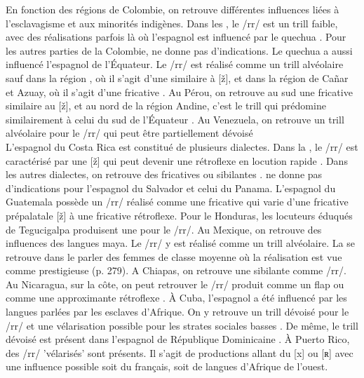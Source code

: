 En fonction des régions de Colombie, on retrouve différentes influences liées à l'esclavagisme et aux minorités indigènes. Dans les , le /rr/ est un trill faible, avec des réalisations parfois  là où l'espagnol est influencé par le quechua \parencite[209]{lipski1994latin}. Pour les autres parties de la Colombie, \citeauthor{lipski1994latin} ne donne pas d'indications.
Le quechua a aussi influencé l'espagnol de l'Équateur. Le /rr/ est réalisé comme un trill alvéolaire sauf dans la région , où il s'agit d'une  similaire à [ž], et dans la région de Cañar et Azuay, où il s'agit d'une fricative \parencite[247--9]{lipski1994latin}. Au Pérou, on retrouve au sud une fricative similaire au [ž], et au nord de la région Andine, c'est le trill qui prédomine similairement à celui du sud de l'Équateur \parencite[320]{lipski1994latin}.
Au Venezuela, on retrouve un trill alvéolaire pour le /rr/ qui peut être partiellement dévoisé \parencite[350]{lipski1994latin}\\

L'espagnol du Costa Rica est constitué de plusieurs dialectes. Dans la , le /rr/ est caractérisé par une  [ž] qui peut devenir une rétroflexe en locution rapide \parencite[222]{lipski1994latin}. Dans les autres dialectes, on retrouve des fricatives ou sibilantes \parencite[224]{lipski1994latin}. \citeauthor{lipski1994latin} ne donne pas d'indications pour l'espagnol du Salvador et celui du Panama. L'espagnol du Guatemala possède un /rr/ réalisé comme une fricative qui varie d'une fricative prépalatale [ž] à une fricative rétroflexe. Pour le Honduras, les locuteurs éduqués de Tegucigalpa produisent une  pour le /rr/. Au Mexique, on retrouve des influences des langues maya. Le /rr/ y est réalisé comme un trill alvéolaire. La  se retrouve dans le parler des femmes de classe moyenne où la réalisation est vue comme prestigieuse (p. 279). A Chiapas, on retrouve une sibilante comme /rr/. Au Nicaragua, sur la côte, on peut retrouver le /rr/ produit comme un flap ou comme une approximante rétroflexe \parencite[291]{lipski1994latin}. 
À Cuba, l'espagnol a été influencé par les langues parlées par les esclaves d'Afrique. On y retrouve un trill dévoisé pour le /rr/ et une vélarisation possible pour les strates sociales basses \parencite[231]{lipski1994latin}. De même, le trill dévoisé est présent dans l'espagnol de République Dominicaine \parencite[239]{lipski1994latin}. À Puerto Rico, des /rr/ 'vélarisés' sont présents. Il s'agit de productions allant du [x] ou [ʀ] \parencite[333]{lipski1994latin} avec une influence possible soit du français, soit de langues d'Afrique de l'ouest.\\

